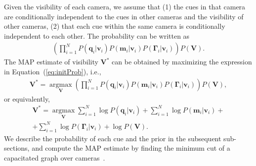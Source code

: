 Given the visibility of each camera, we assume that (1) the cues in that camera are conditionally independent to the cues in other cameras and the visibility of other cameras, (2) that each cue within the same camera is conditionally independent to each other. The probability can be written as
\begin{eqnarray}
\left( \prod_{i=1}^{N} P( \mathbf{q}_i | \mathbf{v}_i )P( \mathbf{m}_i | \mathbf{v}_i) P( \bm{\Gamma}_i| \mathbf{v}_i) \right)P(\mathbf{V}).
\label{eq:initProb}
\end{eqnarray}
The MAP estimate of visibility $\mathbf{V}^*$ can be obtained by maximizing the expression in Equation~(\ref{eq:initProb}), i.e., 
\begin{eqnarray}
\mathbf{V^*} = \underset{\mathbf{V}}{\operatorname{argmax}}  \left( \prod_{i=1}^{N} P( \mathbf{q}_i | \mathbf{v}_i )P( \mathbf{m}_i | \mathbf{v}_i)P( \bm{\Gamma}_i| \mathbf{v}_i) \right) P(\mathbf{V}), \nonumber
\end{eqnarray}
or equivalently,
\begin{eqnarray}
\mathbf{V^*} =\underset{\mathbf{V}}{\operatorname{argmax}}  \sum_{i=1}^{N} \log P( \mathbf{q}_i | \mathbf{v}_i)  + \sum_{i=1}^{N} \log P( \mathbf{m}_i | \mathbf{v}_i ) +\nonumber\\
+ \sum_{i=1}^{N} \log P( \bm{\Gamma}_i| \mathbf{v}_i) + \log P(\mathbf{V}).
\label{eq:goalFunction}
\end{eqnarray}
We describe the probability of each cue and the prior in the subsequent sub-sections, and compute the MAP estimate by finding the minimum cut of a capacitated graph over cameras~\cite{boykov2001fast}. 


